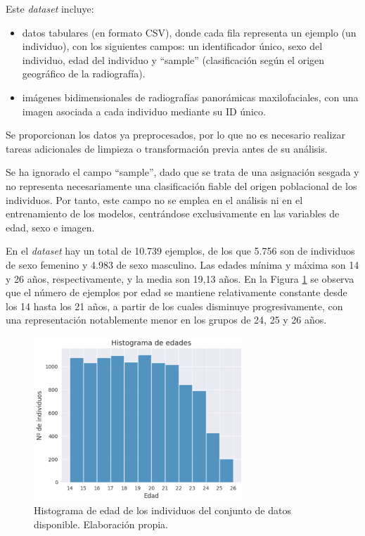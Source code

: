 Este \textit{dataset} incluye:

\begin{itemize}

    \item datos tabulares (en formato CSV), donde cada fila representa un ejemplo (un individuo), con los 
    siguientes campos: un identificador único, sexo del individuo, edad del individuo y ``sample'' 
    (clasificación según el origen geográfico de la radiografía).

    \item imágenes bidimensionales de radiografías panorámicas maxilofaciales, con una imagen asociada 
    a cada individuo mediante su ID único. 

\end{itemize}

Se proporcionan los datos ya preprocesados, por lo que no es necesario realizar tareas adicionales de limpieza 
o transformación previa antes de su análisis.

Se ha ignorado el campo ``sample'', dado que se trata de una asignación sesgada y no representa 
necesariamente una clasificación fiable del origen poblacional de los individuos. Por tanto, este campo no 
se emplea en el análisis ni en el entrenamiento de los modelos, centrándose exclusivamente en las variables 
de edad, sexo e imagen.

En el \textit{dataset} hay un total de 10.739 ejemplos, de los que 5.756 son de individuos de sexo femenino 
y 4.983 de sexo masculino. 
Las edades mínima y máxima son 14 y 26 años, respectivamente, y la media son 19,13 años.
En la Figura \ref{fig:histogram_ages} se observa que el número de ejemplos por edad se mantiene relativamente 
constante desde los 14 hasta los 21 años, a partir de los cuales disminuye progresivamente, con una 
representación notablemente menor en los grupos de 24, 25 y 26 años.
 
\begin{figure}[h]
    \centering
    \includegraphics[width=0.7\textwidth]{capitulos/cap_04/imagenes/histogram_ages.png}
    \caption[
        Histograma de edad de los individuos del conjunto de datos disponible.
    ]{
        Histograma de edad de los individuos del conjunto de datos disponible. 
        Elaboración propia.
    } 
    \label{fig:histogram_ages}
\end{figure}

